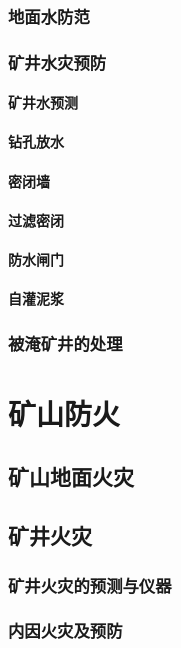 \documentclass[UTF8]{../../ApplicationUniverse}
\begin{document}
        \subsubsection{地面水防范}
        \subsubsection{矿井水灾预防}
            \paragraph{矿井水预测}
            \paragraph{钻孔放水}
            \paragraph{密闭墙}
            \paragraph{过滤密闭}
            \paragraph{防水闸门}
            \paragraph{自灌泥浆}
        \subsubsection{被淹矿井的处理}
\section{矿山防火}
    \subsection{矿山地面火灾}
    \subsection{矿井火灾}
        \subsubsection{矿井火灾的预测与仪器}
        \subsubsection{内因火灾及预防}
\end{document}
